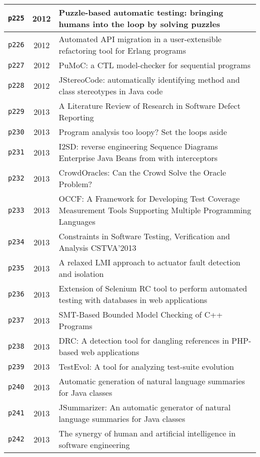 \begin{longtable}{| c | c | p{16cm} |}
  \hline
  \texttt{p225} & 2012 & Puzzle-based automatic testing: bringing humans into the loop by solving puzzles \\
  \hline
  \texttt{p226} & 2012 & Automated API migration in a user-extensible refactoring tool for Erlang programs \\
  \hline
  \texttt{p227} & 2012 & PuMoC: a CTL model-checker for sequential programs \\
  \hline
  \texttt{p228} & 2012 & JStereoCode: automatically identifying method and class stereotypes in Java code \\
  \hline
  \texttt{p229} & 2013 & A Literature Review of Research in Software Defect Reporting \\
  \hline
  \texttt{p230} & 2013 & Program analysis too loopy? Set the loops aside \\
  \hline
  \texttt{p231} & 2013 & I2SD: reverse engineering Sequence Diagrams Enterprise Java Beans from with interceptors \\
  \hline
  \texttt{p232} & 2013 & CrowdOracles: Can the Crowd Solve the Oracle Problem? \\
  \hline
  \texttt{p233} & 2013 & OCCF: A Framework for Developing Test Coverage Measurement Tools Supporting Multiple Programming Languages \\
  \hline
  \texttt{p234} & 2013 & Constraints in Software Testing, Verification and Analysis CSTVA'2013 \\
  \hline
  \texttt{p235} & 2013 & A relaxed LMI approach to actuator fault detection and isolation \\
  \hline
  \texttt{p236} & 2013 & Extension of Selenium RC tool to perform automated testing with databases in web applications \\
  \hline
  \texttt{p237} & 2013 & SMT-Based Bounded Model Checking of C++ Programs \\
  \hline
  \texttt{p238} & 2013 & DRC: A detection tool for dangling references in PHP-based web applications \\
  \hline
  \texttt{p239} & 2013 & TestEvol: A tool for analyzing test-suite evolution \\
  \hline
  \texttt{p240} & 2013 & Automatic generation of natural language summaries for Java classes \\
  \hline
  \texttt{p241} & 2013 & JSummarizer: An automatic generator of natural language summaries for Java classes \\
  \hline
  \texttt{p242} & 2013 & The synergy of human and artificial intelligence in software engineering \\

\end{longtable}

